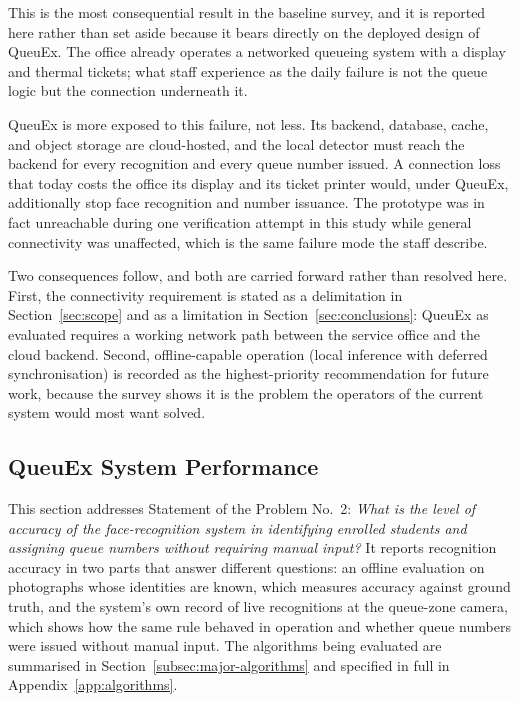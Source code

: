 \documentclass{research}
\newcommand{\sysname}{QueuEx}
\begin{document}
\noindent This is the most consequential result in the baseline survey,
and it is reported here rather than set aside because it bears directly
on the deployed design of \sysname{}. The office already operates a
networked queueing system with a display and thermal tickets; what
staff experience as the daily failure is not the queue logic but the
connection underneath it.

\sysname{} is more exposed to this failure, not less. Its backend,
database, cache, and object storage are cloud-hosted, and the local
detector must reach the backend for every recognition and every queue
number issued. A connection loss that today costs the office its
display and its ticket printer would, under \sysname{}, additionally
stop face recognition and number issuance. The prototype was in fact
unreachable during one verification attempt in this study while general
connectivity was unaffected, which is the same failure mode the staff
describe.

Two consequences follow, and both are carried forward rather than
resolved here. First, the connectivity requirement is stated as a
delimitation in Section~\ref{sec:scope} and as a limitation in
Section~\ref{sec:conclusions}: \sysname{} as evaluated requires a
working network path between the service office and the cloud backend.
Second, offline-capable operation (local inference with deferred
synchronisation) is recorded as the highest-priority recommendation
for future work, because the survey shows it is the problem the
operators of the current system would most want solved.

\subsection{\sysname{} System Performance}
\label{sec:sop2-results}
\label{sec:design}

This section addresses Statement of the Problem No.~2: \emph{What is
the level of accuracy of the face-recognition system in identifying
enrolled students and assigning queue numbers without requiring manual
input?} It reports recognition accuracy in two parts that answer
different questions: an offline evaluation on photographs whose
identities are known, which measures accuracy against ground truth, and
the system's own record of live recognitions at the queue-zone camera,
which shows how the same rule behaved in operation and whether queue
numbers were issued without manual input. The algorithms being
evaluated are summarised in Section~\ref{subsec:major-algorithms} and
specified in full in Appendix~\ref{app:algorithms}.
\end{document}
